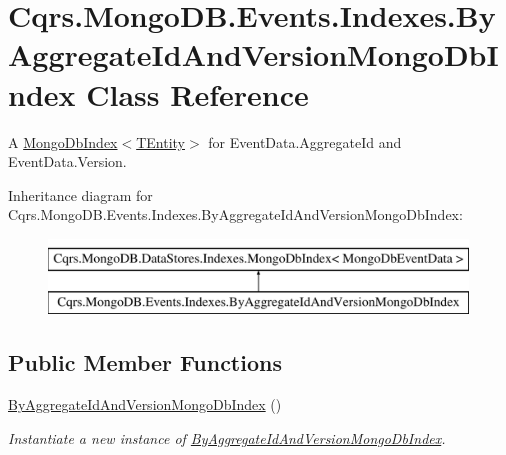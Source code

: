 \hypertarget{classCqrs_1_1MongoDB_1_1Events_1_1Indexes_1_1ByAggregateIdAndVersionMongoDbIndex}{}\section{Cqrs.\+Mongo\+D\+B.\+Events.\+Indexes.\+By\+Aggregate\+Id\+And\+Version\+Mongo\+Db\+Index Class Reference}
\label{classCqrs_1_1MongoDB_1_1Events_1_1Indexes_1_1ByAggregateIdAndVersionMongoDbIndex}


A \hyperlink{classCqrs_1_1MongoDB_1_1DataStores_1_1Indexes_1_1MongoDbIndex_a61f4b17dd968f92e81562c70ae062a89_a61f4b17dd968f92e81562c70ae062a89}{Mongo\+Db\+Index$<$\+T\+Entity$>$} for Event\+Data.\+Aggregate\+Id and Event\+Data.\+Version.  


Inheritance diagram for Cqrs.\+Mongo\+D\+B.\+Events.\+Indexes.\+By\+Aggregate\+Id\+And\+Version\+Mongo\+Db\+Index\+:\begin{figure}[H]
\begin{center}
\leavevmode
\includegraphics[height=2.000000cm]{classCqrs_1_1MongoDB_1_1Events_1_1Indexes_1_1ByAggregateIdAndVersionMongoDbIndex}
\end{center}
\end{figure}
\subsection*{Public Member Functions}
\begin{DoxyCompactItemize}
\item 
\hyperlink{classCqrs_1_1MongoDB_1_1Events_1_1Indexes_1_1ByAggregateIdAndVersionMongoDbIndex_a084cc895e473e0e0ea2dbcf81bba4514_a084cc895e473e0e0ea2dbcf81bba4514}{By\+Aggregate\+Id\+And\+Version\+Mongo\+Db\+Index} ()
\begin{DoxyCompactList}\small\item\em Instantiate a new instance of \hyperlink{classCqrs_1_1MongoDB_1_1Events_1_1Indexes_1_1ByAggregateIdAndVersionMongoDbIndex}{By\+Aggregate\+Id\+And\+Version\+Mongo\+Db\+Index}. \end{DoxyCompactList}\end{DoxyCompactItemize}
